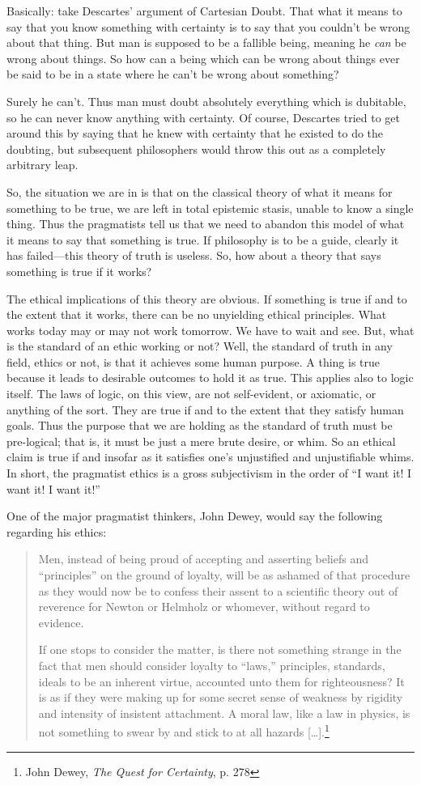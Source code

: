 \documentclass[11pt]{article}
\begin{document}
Basically: take Descartes' argument of Cartesian Doubt. That what it means to say that you know something with certainty is to say that you couldn't be wrong about that thing. But man is supposed to be a fallible being, meaning he \emph{can} be wrong about things. So how can a being which can be wrong about things ever be said to be in a state where he can't be wrong about something?

Surely he can't. Thus man must doubt absolutely everything which is dubitable, so he can never know anything with certainty. Of course, Descartes tried to get around this by saying that he knew with certainty that he existed to do the doubting, but subsequent philosophers would throw this out as a completely arbitrary leap.

So, the situation we are in is that on the classical theory of what it means for something to be true, we are left in total epistemic stasis, unable to know a single thing. Thus the pragmatists tell us that we need to abandon this model of what it means to say that something is true. If philosophy is to be a guide, clearly it has failed---this theory of truth is useless. So, how about a theory that says something is true if it works?

The ethical implications of this theory are obvious. If something is true if and to the extent that it works, there can be no unyielding ethical principles. What works today may or may not work tomorrow. We have to wait and see. But, what is the standard of an ethic working or not? Well, the standard of truth in any field, ethics or not, is that it achieves some human purpose. A thing is true because it leads to desirable outcomes to hold it as true. This applies also to logic itself. The laws of logic, on this view, are not self-evident, or axiomatic, or anything of the sort. They are true if and to the extent that they satisfy human goals. Thus the purpose that we are holding as the standard of truth must be pre-logical; that is, it must be just a mere brute desire, or whim. So an ethical claim is true if and insofar as it satisfies one's unjustified and unjustifiable whims. In short, the pragmatist ethics is a gross subjectivism in the order of ``I want it! I want it! I want it!''

One of the major pragmatist thinkers, John Dewey, would say the following regarding his ethics:
\begin{quote}
Men, instead of being proud of accepting and asserting beliefs and ``principles'' on the ground of loyalty, will be as ashamed of that procedure as they would now be to confess their assent to a scientific theory out of reverence for Newton or Helmholz or whomever, without regard to evidence.

If one stops to consider the matter, is there not something strange in the fact that men should consider loyalty to ``laws,'' principles, standards, ideals to be an inherent virtue, accounted unto them for righteousness? It is as if they were making up for some secret sense of weakness by rigidity and intensity of insistent attachment. A moral law, like a law in physics, is not something to swear by and stick to at all hazards [\ldots{}].\footnote{John Dewey, \emph{The Quest for Certainty}, p. 278}
\end{quote}
\end{document}

